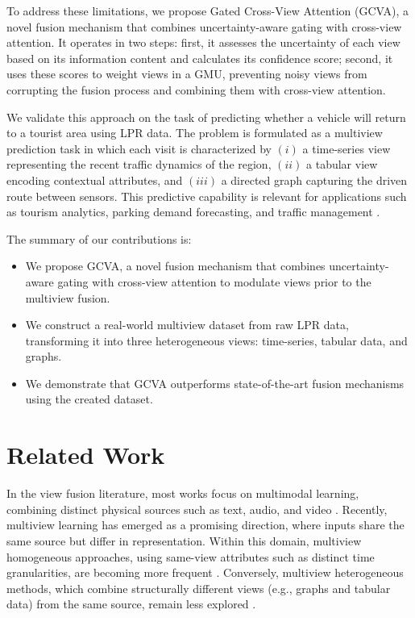 \documentclass[journal]{IEEEtran}
\begin{document}
To address these limitations, we propose Gated Cross-View Attention (GCVA), a novel fusion mechanism that combines uncertainty-aware gating with cross-view attention. It operates in two steps: first, it assesses the uncertainty of each view based on its information content and calculates its confidence score; second, it uses these scores to weight views in a GMU, preventing noisy views from corrupting the fusion process and combining them with cross-view attention.

We validate this approach on the task of predicting whether a vehicle will return to a tourist area using LPR data. The problem is formulated as a multiview prediction task in which each visit is characterized by $(i)$ a time-series view representing the recent traffic dynamics of the region, $(ii)$ a tabular view encoding contextual attributes, and $(iii)$ a directed graph capturing the driven route between sensors. This predictive capability is relevant for applications such as tourism analytics, parking demand forecasting, and traffic management \cite{duran2026gct,duran2026edrs}. 

The summary of our contributions is:

\begin{itemize}
    \item We propose GCVA, a novel fusion mechanism that combines uncertainty-aware gating with cross-view attention to modulate views prior to the multiview fusion.
    \item We construct a real-world multiview dataset from raw LPR data, transforming it into three heterogeneous views: time-series, tabular data, and graphs.
    \item We demonstrate that GCVA outperforms state-of-the-art fusion mechanisms using the created dataset.
\end{itemize}


\section{Related Work} \label{sec:related_work}

In the view fusion literature, most works focus on multimodal learning, combining distinct physical sources such as text, audio, and video \cite{lin2024m3sa,wei2022subattentional,ilias2024cross,du2022gatedattention, wu2024wttfnet, zhou2024large, narvaez2023minimal}. Recently, multiview learning has emerged as a promising direction, where inputs share the same source but differ in representation. Within this domain, multiview homogeneous approaches, using same-view attributes such as distinct time granularities, are becoming more frequent \cite{chen2025detection, guo2024contrastive, jiang2023multi, shi2022multi}. Conversely, multiview heterogeneous methods, which combine structurally different views (e.g., graphs and tabular data) from the same source, remain less explored \cite{cao2023multi, yi2022multi}.
\end{document}
